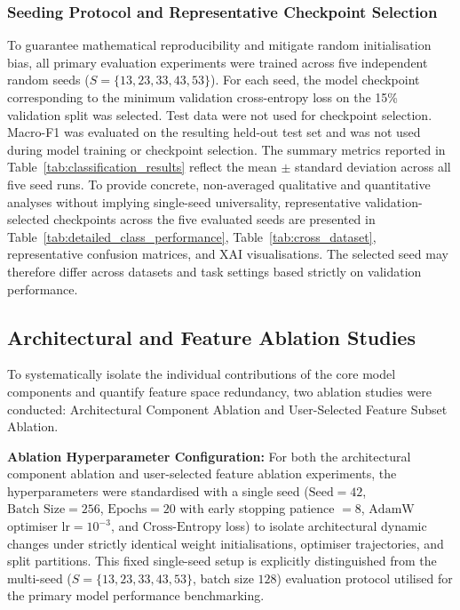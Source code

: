 \documentclass[a4paper,fleqn]{cas-sc}
\begin{document}
\subsubsection{Seeding Protocol and Representative Checkpoint Selection}
To guarantee mathematical reproducibility and mitigate random initialisation bias, all primary evaluation experiments were trained across five independent random seeds ($S = \{13, 23, 33, 43, 53\}$). For each seed, the model checkpoint corresponding to the minimum validation cross-entropy loss on the 15\% validation split was selected. Test data were not used for checkpoint selection. Macro-F1 was evaluated on the resulting held-out test set and was not used during model training or checkpoint selection. The summary metrics reported in Table~\ref{tab:classification_results} reflect the mean $\pm$ standard deviation across all five seed runs. To provide concrete, non-averaged qualitative and quantitative analyses without implying single-seed universality, representative validation-selected checkpoints across the five evaluated seeds are presented in Table~\ref{tab:detailed_class_performance}, Table~\ref{tab:cross_dataset}, representative confusion matrices, and XAI visualisations. The selected seed may therefore differ across datasets and task settings based strictly on validation performance.


\subsection{Architectural and Feature Ablation Studies}
\label{sec:ablation_studies}

To systematically isolate the individual contributions of the core model components and quantify feature space redundancy, two ablation studies were conducted: Architectural Component Ablation and User-Selected Feature Subset Ablation.


\textbf{Ablation Hyperparameter Configuration:} For both the architectural component ablation and user-selected feature ablation experiments, the hyperparameters were standardised with a single seed ($\text{Seed} = 42$, $\text{Batch Size} = 256$, $\text{Epochs} = 20$ with early stopping patience $= 8$, $\text{AdamW}$ optimiser $\text{lr} = 10^{-3}$, and $\text{Cross-Entropy}$ loss) to isolate architectural dynamic changes under strictly identical weight initialisations, optimiser trajectories, and split partitions. This fixed single-seed setup is explicitly distinguished from the multi-seed ($S=\{13, 23, 33, 43, 53\}$, batch size $128$) evaluation protocol utilised for the primary model performance benchmarking.
\end{document}

